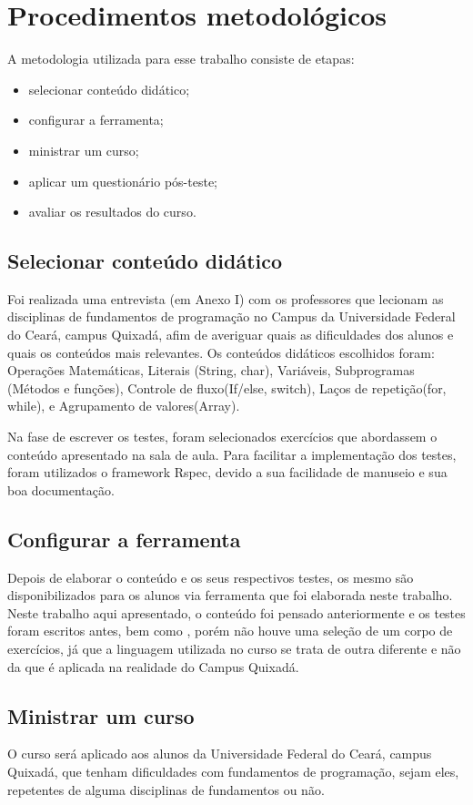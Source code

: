 \documentclass[pnumabnt,normaltoc,espacoumemeio,capchap]{abnt}
\begin{document}
\chapter{Procedimentos metodológicos}
\par A metodologia utilizada para esse trabalho consiste de etapas: 
\begin{itemize}
	\item selecionar conteúdo didático;
	\item configurar a ferramenta;
	\item ministrar um curso;
	\item aplicar um questionário pós-teste;
	\item avaliar os resultados do curso.
\end{itemize}
\section{Selecionar conteúdo didático}
\par Foi realizada uma entrevista (em Anexo I) com os professores que lecionam as disciplinas de fundamentos de programação no Campus da Universidade Federal do Ceará, campus Quixadá, afim de averiguar quais as dificuldades dos alunos e quais os conteúdos mais relevantes. Os conteúdos didáticos escolhidos foram: Operações Matemáticas, Literais (String, char), Variáveis, Subprogramas (Métodos e funções),  Controle de fluxo(If/else, switch), Laços de repetição(for, while), e Agrupamento de valores(Array). 

\par Na fase de escrever os testes, foram selecionados exercícios que abordassem o conteúdo apresentado na sala de aula. Para facilitar a implementação dos testes, foram utilizados o framework Rspec, devido a sua facilidade de manuseio e sua boa documentação.
\section{Configurar a ferramenta}
\par Depois de elaborar o conteúdo e os seus respectivos testes, os mesmo são disponibilizados para os alunos via ferramenta que foi elaborada neste trabalho. Neste trabalho aqui apresentado, o conteúdo foi pensado anteriormente e os testes foram escritos antes, bem como , porém não houve uma seleção de um corpo de exercícios, já que a linguagem utilizada no curso se trata de outra diferente e não da que é aplicada na realidade do Campus Quixadá.
\section{Ministrar um curso}
\par O curso será aplicado aos alunos da Universidade Federal do Ceará, campus Quixadá, que tenham dificuldades com fundamentos de programação, sejam eles, repetentes de alguma disciplinas de fundamentos ou não. 
\end{document}

